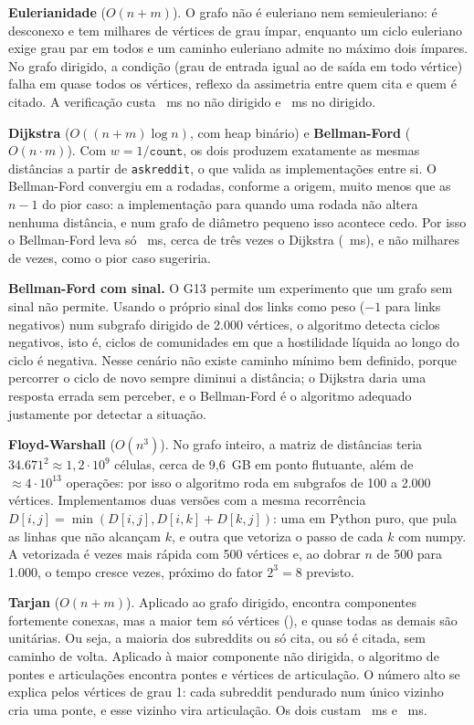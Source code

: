 \IfFileExists{webmedia.cls}{\webmediatrue\documentclass[sigconf]{webmedia}}{\documentclass[sigconf]{acmart}}
\begin{document}
\textbf{Eulerianidade} ($O(n+m)$). O grafo não é euleriano nem semieuleriano: é desconexo e tem
milhares de vértices de grau ímpar, enquanto um ciclo euleriano exige grau par em todos e um caminho
euleriano admite no máximo dois ímpares. No grafo dirigido, a condição (grau de entrada igual ao de
saída em todo vértice) falha em quase todos os vértices, reflexo da assimetria entre quem cita e quem é
citado. A verificação custa \tEulerU~ms no não dirigido e \tEulerD~ms no dirigido.

\textbf{Dijkstra} ($O((n+m)\log n)$, com heap binário) e \textbf{Bellman-Ford} ($O(n \cdot m)$). Com
$w = 1/\texttt{count}$, os dois produzem exatamente as mesmas distâncias a partir de
\texttt{askreddit}, o que valida as implementações entre si. O Bellman-Ford convergiu em \iterBFmin{}
a \iterBFmax{} rodadas, conforme a origem, muito menos que as $n-1$ do pior caso: a implementação para
quando uma rodada não altera nenhuma distância, e num grafo de diâmetro pequeno isso acontece cedo. Por
isso o Bellman-Ford leva só \tBF~ms, cerca de três vezes o Dijkstra (\tDijkstra~ms), e não milhares de
vezes, como o pior caso sugeriria.

\textbf{Bellman-Ford com sinal.} O G13 permite um experimento que um grafo sem sinal não permite.
Usando o próprio sinal dos links como peso ($-1$ para links negativos) num subgrafo dirigido de 2.000
vértices, o algoritmo detecta ciclos negativos, isto é, ciclos de comunidades em que a hostilidade
líquida ao longo do ciclo é negativa. Nesse cenário não existe caminho mínimo bem definido, porque
percorrer o ciclo de novo sempre diminui a distância; o Dijkstra daria uma resposta errada sem perceber,
e o Bellman-Ford é o algoritmo adequado justamente por detectar a situação.

\textbf{Floyd-Warshall} ($O(n^3)$). No grafo inteiro, a matriz de distâncias teria
$34.671^2 \approx 1{,}2\cdot10^9$ células, cerca de 9,6~GB em ponto flutuante, além de
$\approx 4\cdot10^{13}$ operações: por isso o algoritmo roda em subgrafos de 100 a 2.000 vértices.
Implementamos duas versões com a mesma recorrência $D[i,j] = \min(D[i,j], D[i,k] + D[k,j])$: uma em
Python puro, que pula as linhas que não alcançam $k$, e outra que vetoriza o passo de cada $k$ com
numpy. A vetorizada é \razaoFWpuro{} vezes mais rápida com 500 vértices e, ao dobrar $n$ de 500 para
1.000, o tempo cresce \razaoFWmil{} vezes, próximo do fator $2^3 = 8$ previsto.

\textbf{Tarjan} ($O(n+m)$). Aplicado ao grafo dirigido, encontra \nSCC{} componentes fortemente
conexas, mas a maior tem só \maiorSCC{} vértices (\fracSCC), e quase todas as demais são unitárias.
Ou seja, a maioria dos subreddits ou só cita, ou só é citada, sem caminho de volta. Aplicado à maior
componente não dirigida, o algoritmo de pontes e articulações encontra \nPontes{} pontes e
\nArticulacoes{} vértices de articulação. O número alto se explica pelos vértices de grau 1: cada
subreddit pendurado num único vizinho cria uma ponte, e esse vizinho vira articulação. Os dois custam
\tTarjan~ms e \tPontes~ms.
\end{document}
